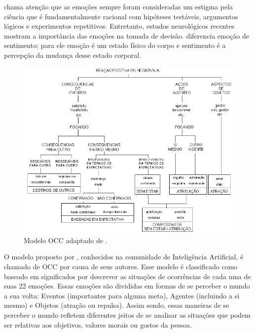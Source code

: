 \citet{Pic98} chama atenção que as emoções sempre foram consideradas um
estigma pela ciência que é fundamentalmente racional com hipóteses testáveis,
argumentos lógicos e experimentos repetitivos.  Entretanto, estudos
neurológicos recentes \cite{ledoux1998emotional,damasio2004erro} mostram a
importância das emoções na tomada de decisão.  \citet{damasio2004erro}
diferencia emoção de sentimento; para ele emoção é um estado físico do corpo e
sentimento é a percepção da mudança desse estado corporal.

\begin{figure}
  \centering
    \includegraphics[width=150mm]{figuras/pontarolo_occ.png}
  \caption{Modelo OCC adaptado de \cite{pontarolo2008modelagem}.}
  \label{fig:occ_model_original}
\end{figure}

O modelo proposto por \citeauthor*{ortony1988cse} \cite{ortony1988cse},
conhecidos na comunidade de Inteligência Artificial, é chamado de OCC por
causa de seus autores.  Esse modelo é classificado como baseado em
significados por descrever as situações de ocorrências de cada uma de suas 22
emoções.  Essas emoções são divididas em formas de se perceber o mundo a sua
volta: Eventos (importantes para alguma meta), Agentes (incluindo a si mesmo)
e Objetos (atração ou repulsa). Assim sendo, essas maneiras de se perceber o
mundo refletem diferentes jeitos de se analisar as situações que podem ser
relativas aos objetivos, valores morais ou gostos da pessoa.


